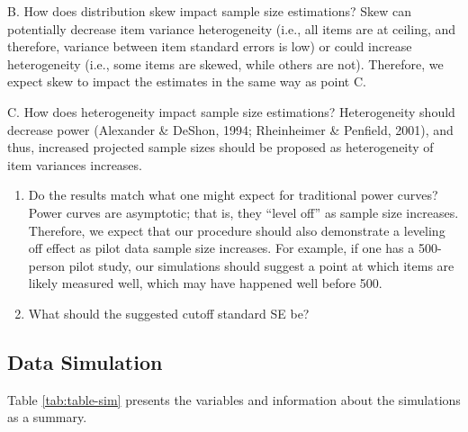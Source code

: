 \documentclass[
  man]{apa7}
\begin{document}
B. How does distribution skew impact sample size estimations? Skew can potentially decrease item variance heterogeneity (i.e., all items are at ceiling, and therefore, variance between item standard errors is low) or could increase heterogeneity (i.e., some items are skewed, while others are not). Therefore, we expect skew to impact the estimates in the same way as point C.

C. How does heterogeneity impact sample size estimations? Heterogeneity should decrease power (Alexander \& DeShon, 1994; Rheinheimer \& Penfield, 2001), and thus, increased projected sample sizes should be proposed as heterogeneity of item variances increases.

\begin{enumerate}
\def\labelenumi{\arabic{enumi})}
\setcounter{enumi}{1}
\item
  Do the results match what one might expect for traditional power curves? Power curves are asymptotic; that is, they ``level off'' as sample size increases. Therefore, we expect that our procedure should also demonstrate a leveling off effect as pilot data sample size increases. For example, if one has a 500-person pilot study, our simulations should suggest a point at which items are likely measured well, which may have happened well before 500.
\item
  What should the suggested cutoff standard SE be?
\end{enumerate}

\subsection{Data Simulation}\label{data-simulation}

Table \ref{tab:table-sim} presents the variables and information about the simulations as a summary.
\end{document}
